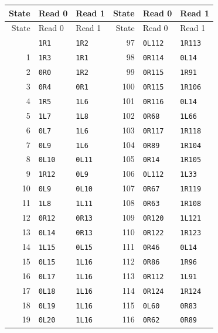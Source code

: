 \small
\begin{longtable}{@{}rll@{\hspace{1.6cm}}rll@{}}
\toprule State & Read 0 & Read 1 & State & Read 0 & Read 1\\\midrule
\endfirsthead
\toprule State & Read 0 & Read 1 & State & Read 0 & Read 1\\\midrule
\endhead
\bottomrule\endfoot
0 & \texttt{1R1} & \texttt{1R2} & 97 & \texttt{0L112} & \texttt{1R113} \\
1 & \texttt{1R3} & \texttt{1R1} & 98 & \texttt{0R114} & \texttt{0L14} \\
2 & \texttt{0R0} & \texttt{1R2} & 99 & \texttt{0R115} & \texttt{1R91} \\
3 & \texttt{0R4} & \texttt{0R1} & 100 & \texttt{0R115} & \texttt{1R106} \\
4 & \texttt{1R5} & \texttt{1L6} & 101 & \texttt{0R116} & \texttt{0L14} \\
5 & \texttt{1L7} & \texttt{1L8} & 102 & \texttt{0R68} & \texttt{1L66} \\
6 & \texttt{0L7} & \texttt{1L6} & 103 & \texttt{0R117} & \texttt{1R118} \\
7 & \texttt{0L9} & \texttt{1L6} & 104 & \texttt{0R89} & \texttt{1R104} \\
8 & \texttt{0L10} & \texttt{0L11} & 105 & \texttt{0R14} & \texttt{1R105} \\
9 & \texttt{1R12} & \texttt{0L9} & 106 & \texttt{0L112} & \texttt{1L33} \\
10 & \texttt{0L9} & \texttt{0L10} & 107 & \texttt{0R67} & \texttt{1R119} \\
11 & \texttt{1L8} & \texttt{1L11} & 108 & \texttt{0R63} & \texttt{1R108} \\
12 & \texttt{0R12} & \texttt{0R13} & 109 & \texttt{0R120} & \texttt{1L121} \\
13 & \texttt{0L14} & \texttt{0R13} & 110 & \texttt{0R122} & \texttt{1R123} \\
14 & \texttt{1L15} & \texttt{0L15} & 111 & \texttt{0R46} & \texttt{0L14} \\
15 & \texttt{0L15} & \texttt{1L16} & 112 & \texttt{0R86} & \texttt{1R96} \\
16 & \texttt{0L17} & \texttt{1L16} & 113 & \texttt{0R112} & \texttt{1L91} \\
17 & \texttt{0L18} & \texttt{1L16} & 114 & \texttt{0R124} & \texttt{1R124} \\
18 & \texttt{0L19} & \texttt{1L16} & 115 & \texttt{0L60} & \texttt{0R83} \\
19 & \texttt{0L20} & \texttt{1L16} & 116 & \texttt{0R62} & \texttt{0R89} \\

\end{longtable}
